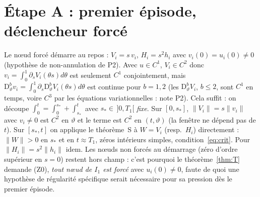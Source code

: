 \documentclass[11pt,a4paper]{article}
\theoremstyle{remark}
\newcommand{\vth}{\vartheta}
\newcommand{\D}{\mathrm D}
\begin{document}
\section{Étape A : premier épisode, déclencheur forcé}
Le nœud forcé démarre au repos : $V_i=s\,v_i$, $H_i=s^2h_i$ avec $v_i(0)=u_i(0)\neq0$ (hypothèse de non-annulation de P2). Avec $u\in C^1$, $V_i\in C^2$ donc $v_i=\int_0^1\partial_sV_i(\theta s)d\theta$ est seulement $C^1$ conjointement, mais $\D^b_\vth v_i=\int_0^1\partial_s\D^b_\vth V_i(\theta s)d\theta$ est continue pour $b=1,2$ (les $\D_\vth^bV_i$, $b\le 2$, sont $C^1$ en temps, voire $C^3$ par les équations variationnelles : note P2). Cela suffit : on découpe $\int_0^t=\int_0^{s_*}+\int_{s_*}^t$ avec $s_*\in\,]0,T_1[$ \emph{fixe}. Sur $[0,s_*]$, $\lVert V_i\rVert=s\lVert v_i\rVert$ avec $v_i\neq0$ est $C^2$ en $\vth$ et le terme est $C^2$ en $(t,\vth)$ (la fenêtre ne dépend pas de $t$). Sur $[s_*,t]$ on applique le théorème~S à $W=V_i$ (resp.\ $H_i$) directement : $\lVert W\rVert>0$ en $s_*$ et en $t\approx T_1$, zéros intérieurs simples, condition~\eqref{eq:crit}. Pour $\lVert H_i\rVert=s^2\lVert h_i\rVert$ idem. Les nœuds non forcés au démarrage (zéro d'ordre supérieur en $s=0$) restent hors champ : c'est pourquoi le théorème~\ref{thm:T} demande (Z0), \emph{tout nœud de $I_1$ est forcé} avec $u_i(0)\ne0$, faute de quoi une hypothèse de régularité spécifique serait nécessaire pour sa pression dès le premier épisode.
\end{document}
